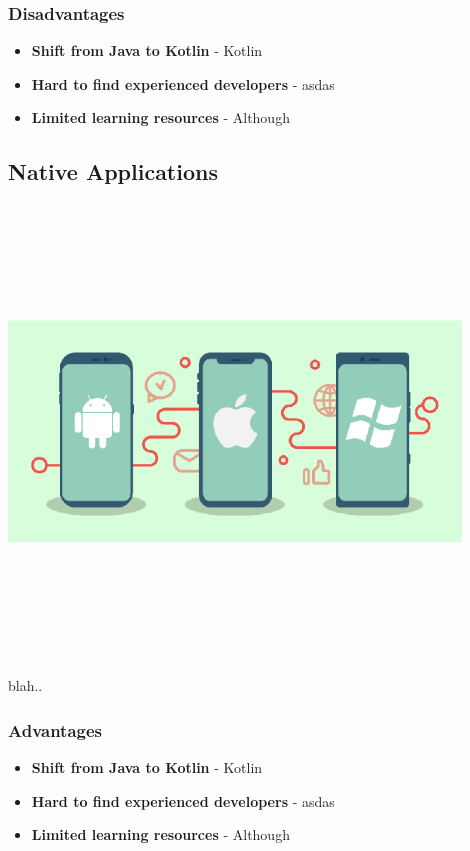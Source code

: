 \subsubsection{Disadvantages}
\begin{itemize}
    \item \textbf{Shift from Java to Kotlin} - Kotlin
    \item \textbf{Hard to find experienced developers} - asdas
    \item \textbf{Limited learning resources} - Although
\end{itemize}

\subsection{Native Applications}
\par
\medskip
\begin{center}
    \includegraphics[width=12cm,height=12cm,keepaspectratio]{Images/nativeapp2.png}
\end{center}

blah..


\subsubsection{Advantages}
\begin{itemize}
    \item \textbf{Shift from Java to Kotlin} - Kotlin
    \item \textbf{Hard to find experienced developers} - asdas
    \item \textbf{Limited learning resources} - Although
\end{itemize}
